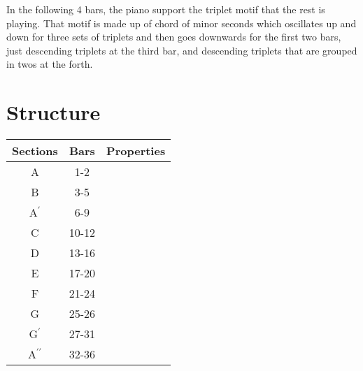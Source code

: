 \documentclass[a4paper]{article}
\begin{document}
In the following 4 bars, the piano support the triplet motif that the rest is
playing. That motif is made up of chord of minor seconds which oscillates up
and down for three sets of triplets and then goes downwards for the first two
bars, just descending triplets at the third bar, and descending triplets
that are grouped in twos at the forth.

\section{Structure}

\begin{tabular}{|c|c|c|}
    \hline
    Sections&Bars&Properties\\
    \hline
    A&1-2&\\
    \hline
    B&3-5&\\
    \hline
    A\(^\prime\)&6-9&\\
    \hline
    C&10-12&\\
    \hline
    D&13-16&\\
    \hline
    E&17-20&\\
    \hline
    F&21-24&\\
    \hline
    G&25-26&\\
    \hline
    G\(^\prime\)&27-31&\\
    \hline
    A\(^{\prime\prime}\)&32-36&\\
    \hline
\end{tabular}
\end{document}
